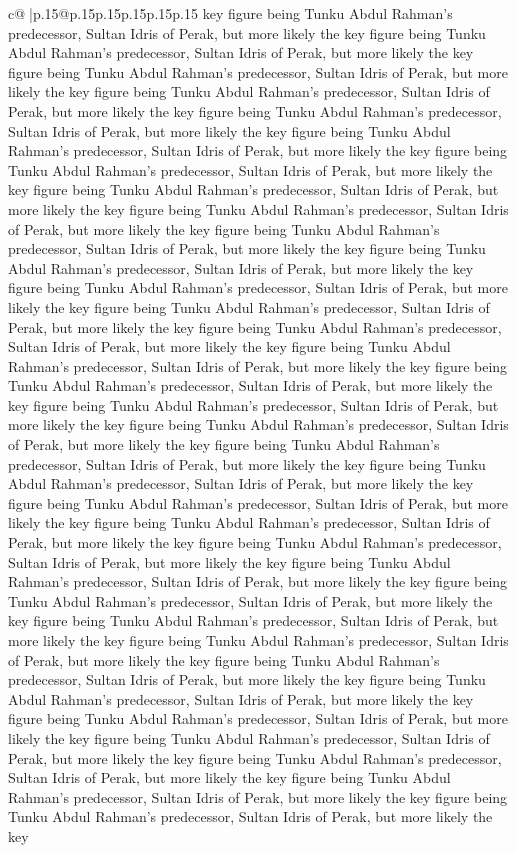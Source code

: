 \documentclass{article}
\begin{document}
{\begin{supertabular}{c@{$\;$}|p{.15\linewidth}@{}p{.15\linewidth}p{.15\linewidth}p{.15\linewidth}p{.15\linewidth}p{.15\linewidth}}
{{{key figure being Tunku Abdul Rahman's predecessor, Sultan Idris of Perak, but more likely the key figure being Tunku Abdul Rahman's predecessor, Sultan Idris of Perak, but more likely the key figure being Tunku Abdul Rahman's predecessor, Sultan Idris of Perak, but more likely the key figure being Tunku Abdul Rahman's predecessor, Sultan Idris of Perak, but more likely the key figure being Tunku Abdul Rahman's predecessor, Sultan Idris of Perak, but more likely the key figure being Tunku Abdul Rahman's predecessor, Sultan Idris of Perak, but more likely the key figure being Tunku Abdul Rahman's predecessor, Sultan Idris of Perak, but more likely the key figure being Tunku Abdul Rahman's predecessor, Sultan Idris of Perak, but more likely the key figure being Tunku Abdul Rahman's predecessor, Sultan Idris of Perak, but more likely the key figure being Tunku Abdul Rahman's predecessor, Sultan Idris of Perak, but more likely the key figure being Tunku Abdul Rahman's predecessor, Sultan Idris of Perak, but more likely the key figure being Tunku Abdul Rahman's predecessor, Sultan Idris of Perak, but more likely the key figure being Tunku Abdul Rahman's predecessor, Sultan Idris of Perak, but more likely the key figure being Tunku Abdul Rahman's predecessor, Sultan Idris of Perak, but more likely the key figure being Tunku Abdul Rahman's predecessor, Sultan Idris of Perak, but more likely the key figure being Tunku Abdul Rahman's predecessor, Sultan Idris of Perak, but more likely the key figure being Tunku Abdul Rahman's predecessor, Sultan Idris of Perak, but more likely the key figure being Tunku Abdul Rahman's predecessor, Sultan Idris of Perak, but more likely the key figure being Tunku Abdul Rahman's predecessor, Sultan Idris of Perak, but more likely the key figure being Tunku Abdul Rahman's predecessor, Sultan Idris of Perak, but more likely the key figure being Tunku Abdul Rahman's predecessor, Sultan Idris of Perak, but more likely the key figure being Tunku Abdul Rahman's predecessor, Sultan Idris of Perak, but more likely the key figure being Tunku Abdul Rahman's predecessor, Sultan Idris of Perak, but more likely the key figure being Tunku Abdul Rahman's predecessor, Sultan Idris of Perak, but more likely the key figure being Tunku Abdul Rahman's predecessor, Sultan Idris of Perak, but more likely the key figure being Tunku Abdul Rahman's predecessor, Sultan Idris of Perak, but more likely the key figure being Tunku Abdul Rahman's predecessor, Sultan Idris of Perak, but more likely the key figure being Tunku Abdul Rahman's predecessor, Sultan Idris of Perak, but more likely the key figure being Tunku Abdul Rahman's predecessor, Sultan Idris of Perak, but more likely the key figure being Tunku Abdul Rahman's predecessor, Sultan Idris of Perak, but more likely the key figure being Tunku Abdul Rahman's predecessor, Sultan Idris of Perak, but more likely the key figure being Tunku Abdul Rahman's predecessor, Sultan Idris of Perak, but more likely the key figure being Tunku Abdul Rahman's predecessor, Sultan Idris of Perak, but more likely the key figure being Tunku Abdul Rahman's predecessor, Sultan Idris of Perak, but more likely the key }}}
\end{supertabular}}
\end{document}
